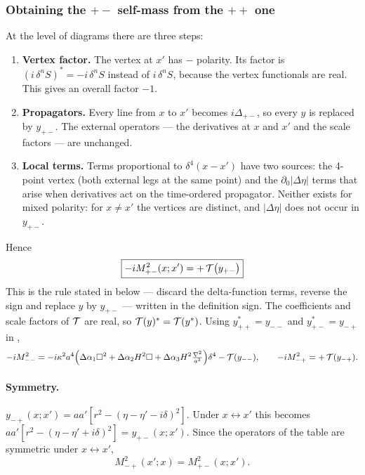 \subsubsection{Obtaining the \texorpdfstring{$+-$}{+-} self-mass from the \texorpdfstring{$++$}{++} one}
At the level of diagrams there are three steps:
\begin{enumerate}[leftmargin=16pt]
\item \textbf{Vertex factor.} The vertex at $x'$ has $-$ polarity. Its factor is $(i\,\delta^nS)^*=-i\,\delta^nS$ instead of $i\,\delta^nS$, because the vertex functionals are real.
This gives an overall factor $-1$.
\item \textbf{Propagators.} Every line from $x$ to $x'$ becomes $i\Delta_{+-}$, so every $y$ is replaced by $y_{+-}$.
The external operators --- the derivatives at $x$ and $x'$ and the scale factors --- are unchanged.
\item \textbf{Local terms.} Terms proportional to $\delta^4(x-x')$ have two sources: the 4-point vertex (both external legs at the same point) and the
$\partial_0|\Delta\eta|$ terms that arise when derivatives act on the time-ordered propagator. Neither exists for mixed polarity:
for $x\neq x'$ the vertices are distinct, and $|\Delta\eta|$ does not occur in $y_{+-}$.
\end{enumerate}
Hence \tD
\begin{equation}
\boxed{-iM^2_{+-}(x;x')=+\,\mathcal{T}\big(y_{+-}\big)}
\label{eq:ch09-Mpm}
\end{equation}
This is the rule stated in \PII{} below  --- discard the delta-function terms, reverse the sign and replace $y$ by $y_{+-}$ --- written in the definition sign.
The coefficients and scale factors of $\mathcal{T}$ are real, so $\mathcal{T}(y)^*=\mathcal{T}(y^*)$. Using $y_{++}^*=y_{--}$ and $y_{+-}^*=y_{-+}$ in ,
\begin{equation}
-iM^2_{--}=-i\kappa^2a^4\Big(\Delta\alpha_1\square^2+\Delta\alpha_2H^2\square+\Delta\alpha_3H^2\tfrac{\nabla^2}{a^2}\Big)\delta^4-\mathcal{T}(y_{--}),\qquad
-iM^2_{-+}=+\,\mathcal{T}(y_{-+}).
\label{eq:ch09-Mmm}
\end{equation}

\paragraph{Symmetry.} $y_{-+}(x;x')=aa'[r^2-(\eta-\eta'-i\delta)^2]$. Under $x\leftrightarrow x'$ this becomes
$aa'[r^2-(\eta-\eta'+i\delta)^2]=y_{+-}(x;x')$. Since the operators of the table are symmetric under $x\leftrightarrow x'$,
\begin{equation}
M^2_{-+}(x';x)=M^2_{+-}(x;x').
\label{eq:ch09-sym}
\end{equation}

